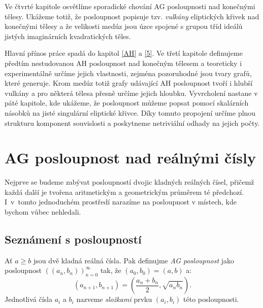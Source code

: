 \documentclass[12pt]{report}
\begin{document}
Ve čtvrté kapitole osvětlíme sporadické chování AG posloupnosti nad konečnými tělesy. Ukážeme totiž, že posloupnost popisuje tzv. \textit{vulkány} eliptických křivek nad konečnými tělesy a že velikosti medúz jsou úzce spojené s grupou tříd ideálů jistých imaginárních kvadratických těles.

Hlavní přínos práce spadá do kapitol \ref{AH} a \ref{5}. Ve třetí kapitole definujeme předtím nestudovanou AH posloupnost nad konečným tělesem a teoreticky i experimentálně určíme jejich vlastnosti, zejména pozoruhodné jsou tvary grafů, které generuje. Krom medúz totiž grafy udávající AH posloupnost tvoří i hlubší vulkány a pro některá tělesa přesně určíme jejich hloubku. Vyvrcholení nastane v páté kapitole, kde ukážeme, že posloupnost můžeme popsat pomocí skalárních násobků na jisté singulární eliptické křivce. Díky tomuto propojení určíme plnou strukturu komponent souvislosti a poskytneme netriviální odhady na jejich počty.


\chapter{AG posloupnost nad reálnými čísly}


Nejprve se budeme zabývat posloupností dvojic kladných reálných čísel, přičemž každá další je tvořena aritmetickým a geometrickým průměrem té předchozí. I~v~tomto jednoduchém prostředí narazíme na posloupnost v místech, kde bychom vůbec nehledali.

\section{Seznámení s posloupností}


\begin{definice}
Ať $a \geqslant b$ jsou dvě kladná reálná čísla. Pak definujme \textit{AG posloupnost} jako posloupnost $((a_n,b_n))_{n=0}^{\infty}$ tak, že $(a_0,b_0) = (a,b)$ a:
$$\left(a_{n+1},b_{n+1} \right) = \left(\frac{a_n+b_n}{2}, \sqrt{a_n b_n} \right).$$
Jednotlivá čísla $a_i$ a $b_i$ nazveme \textit{složkami} prvku $(a_i,b_i)$ této posloupnosti.
\end{definice}
\end{document}
